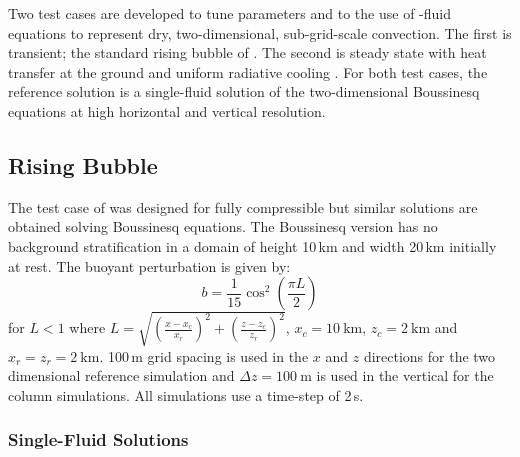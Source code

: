 \documentclass[draft]{agujournal2019}
\begin{document}
Two test cases are developed to tune parameters and to  the
use of -fluid equations to represent dry, two-dimensional, sub-grid-scale
convection. The first is transient; the standard rising bubble of
.  The second  is steady state with heat transfer at
the ground and uniform radiative cooling . For both test cases, the
reference solution is a single-fluid solution of the two-dimensional
Boussinesq equations at high horizontal and vertical resolution.   

\subsection{Rising Bubble}

The  test case of  was designed for fully compressible
 but similar solutions are obtained solving Boussinesq equations.
The Boussinesq version has no background stratification in a domain
of height 10\,km and width 20\,km initially at rest. The buoyant
perturbation is given by:
\begin{equation}
b=\frac{1}{15}\cos^{2}\left(\frac{\pi L}{2}\right)\label{eq:thetaPerturb}
\end{equation}
for $L<1$ where $L=\sqrt{\left(\frac{x-x_{c}}{x_{r}}\right)^{2}+\left(\frac{z-z_{c}}{z_{r}}\right)^{2}}$,
$x_{c}=10\ \text{km}$, $z_{c}=2\ \text{km}$ and $x_{r}=z_{r}=2\ \text{km}$.
100\,m grid spacing is used in the $x$ and $z$ directions for the
two dimensional reference simulation and $\Delta z=100\ \text{m}$
is used in the vertical for the  column simulations. All simulations
use a time-step of 2\,s.

\subsubsection{Single-Fluid Solutions}
\end{document}
